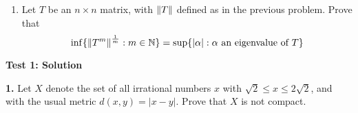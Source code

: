 \documentclass[11pt]{article}
\begin{document}
\begin{enumerate}
\begin{enumerate}
\end{enumerate}

\item  Let $T$ be an $n \times n$ matrix,  with $\norm{T}$ defined as in the previous problem.   Prove that
$$ \inf \{  \norm{T^m} ^\frac{1}{m} : m \in \mathbb{N} \} = \sup \{ |\alpha| : \alpha \mbox{ an eigenvalue of } T \} $$

\end{enumerate}


\newpage

\begin{center}
	{\Large\bf  Test 1:  Solution}
\end{center}


\noindent \textbf{1.} Let $X$ denote the set of all irrational numbers $x$ with $ \sqrt{2} \leq x \leq 2 \sqrt{2}$,   and with the usual metric $d(x,y) = | x - y |$.  Prove that $X$ is not compact.\\
\end{document}
